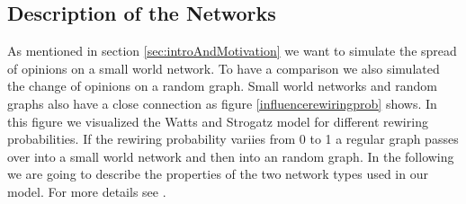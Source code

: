 \subsection{Description of the Networks}
\label{sec:descriptionofnetwork}
As mentioned in section \ref{sec:introAndMotivation} we want to simulate the spread of opinions on a small world network. To have a comparison we also simulated the change of opinions on a random graph. Small world networks and random graphs also have a close connection as figure \ref{influencerewiringprob} shows. In this figure we visualized the Watts and Strogatz model for different rewiring probabilities. If the rewiring probability variies from 0 to 1 a regular graph passes over into a small world network and then into an random graph. In the following we are going to describe the properties of the two network types used in our model. For more details see \cite{Newman2010}.

